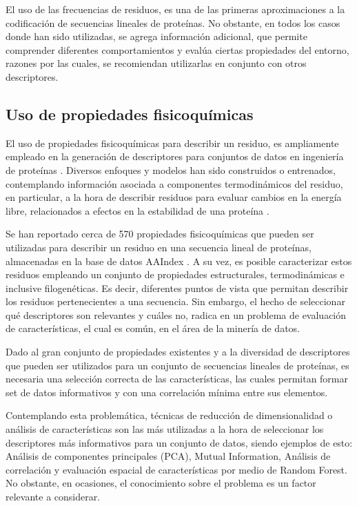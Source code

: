 El uso de las frecuencias de residuos, es una de las primeras aproximaciones a la codificación de secuencias lineales de proteínas. No obstante, en todos los casos donde han sido utilizadas, se agrega información adicional, que permite comprender diferentes comportamientos y evalúa ciertas propiedades del entorno, razones por las cuales, se recomiendan utilizarlas en conjunto con otros descriptores. 

\subsection{Uso de propiedades fisicoquímicas}

El uso de propiedades fisicoquímicas para describir un residuo, es ampliamente empleado en la generación de descriptores para conjuntos de datos en ingeniería de proteínas \cite{capriotti2005mutant2, capriotti2008three}. Diversos enfoques y modelos han sido construidos o entrenados, contemplando información asociada a componentes termodinámicos del residuo, en particular, a la hora de describir residuos para evaluar cambios en la energía libre, relacionados a efectos en la estabilidad de una proteína \cite{ancien2018prediction, broom2017computational, 1gzp030}.

Se han reportado cerca de 570 propiedades fisicoquímicas que pueden ser utilizadas para describir un residuo en una secuencia lineal de proteínas, almacenadas en la base de datos AAIndex \cite{Kawashima2000}. A su vez, es posible caracterizar estos residuos empleando un conjunto de propiedades estructurales, termodinámicas e inclusive filogenéticas. Es decir, diferentes puntos de vista que permitan describir los residuos pertenecientes a una secuencia. Sin embargo, el hecho de seleccionar qué descriptores son relevantes y cuáles no, radica en un problema de evaluación de características, el cual es común, en el área de la minería de datos. 

Dado al gran conjunto de propiedades existentes y a la diversidad de descriptores que pueden ser utilizados para un conjunto de secuencias lineales de proteínas, es necesaria una selección correcta de las características, las cuales permitan formar set de datos informativos y con una correlación mínima entre sus elementos. 

Contemplando esta problemática, técnicas de reducción de dimensionalidad o análisis de características son las más utilizadas a la hora de seleccionar los descriptores más informativos para un conjunto de datos, siendo ejemplos de esto: Análisis de componentes principales (PCA), Mutual Information, Análisis de correlación y evaluación espacial de características por medio de Random Forest. No obstante, en ocasiones, el conocimiento sobre el problema es un factor relevante a considerar. 


